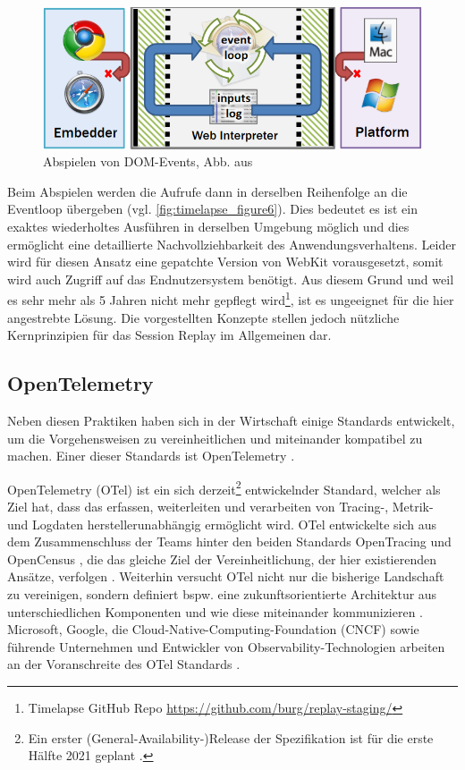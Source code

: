 \begin{figure}
\centering
\includegraphics[width=\linewidth]{img/03_methoden/timelapse_figure6.png}
\caption{Abspielen von DOM-Events, Abb. aus \cite{TimelapsePaper}}
\label{fig:timelapse_figure6}
\end{figure}

Beim Abspielen werden die Aufrufe dann in derselben Reihenfolge an die Eventloop übergeben (vgl. \autoref{fig:timelapse_figure6}). Dies bedeutet es ist ein exaktes wiederholtes Ausführen in derselben Umgebung möglich und dies ermöglicht eine detaillierte Nachvollziehbarkeit des Anwendungsverhaltens. Leider wird für diesen Ansatz eine gepatchte Version von WebKit vorausgesetzt, somit wird auch Zugriff auf das Endnutzersystem benötigt. Aus diesem Grund und weil es sehr mehr als 5 Jahren nicht mehr gepflegt wird\footnote{Timelapse GitHub Repo \url{https://github.com/burg/replay-staging/}}, ist es ungeeignet für die hier angestrebte Lösung. Die vorgestellten Konzepte stellen jedoch nützliche Kernprinzipien für das Session Replay im Allgemeinen dar.

\subsection{OpenTelemetry}
\label{subsec:opentelemetry}

Neben diesen Praktiken haben sich in der Wirtschaft einige Standards entwickelt, um die Vorgehensweisen zu vereinheitlichen und miteinander kompatibel zu machen. Einer dieser Standards ist OpenTelemetry \cite{OpenTelemetry}.

OpenTelemetry (OTel) ist ein sich derzeit\footnote{Ein erster (General-Availability-)Release der Spezifikation ist für die erste Hälfte 2021 geplant \cite{OpenTelemetryGARelease}.} entwickelnder Standard, welcher als Ziel hat, dass das erfassen, weiterleiten und verarbeiten von  Tracing-, Metrik- und Logdaten\footnotemark{} herstellerunabhängig ermöglicht wird. OTel entwickelte sich aus dem Zusammenschluss der Teams hinter den beiden Standards OpenTracing und OpenCensus \cite{OpenCensus}, die das gleiche Ziel der Vereinheitlichung, der hier existierenden Ansätze, verfolgen  \cite{UseNixDistributiveTracing}. Weiterhin versucht OTel nicht nur die bisherige Landschaft zu vereinigen, sondern definiert bspw. eine zukunftsorientierte Architektur aus unterschiedlichen Komponenten und wie diese miteinander kommunizieren \cite{DistributedTracingInPractice}. Microsoft, Google, die Cloud-Native-Computing-Foundation (CNCF) sowie führende Unternehmen und Entwickler von Observability-Technologien arbeiten an der Voranschreite des OTel Standards \cite{DistributedTracingInPractice} \cite{OpenTelemetryCommunityMembers}.


